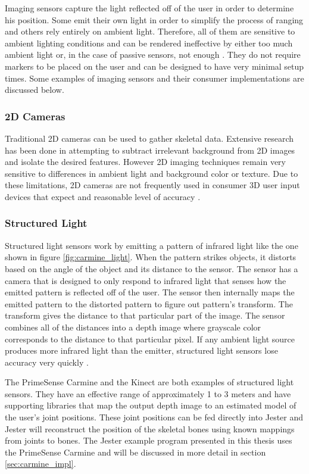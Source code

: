 Imaging sensors capture the light reflected off of the user in order to determine his position. Some emit their own light in order to simplify the process of ranging and others rely entirely on ambient light. Therefore, all of them are sensitive to ambient lighting conditions and can be rendered ineffective by either too much ambient light or, in the case of passive sensors, not enough \cite{besl1988active}. They do not require markers to be placed on the user and can be designed to have very minimal setup times. Some examples of imaging sensors and their consumer implementations are discussed below.

\subsubsection{2D Cameras}

Traditional 2D cameras can be used to gather skeletal data. Extensive research has been done in attempting to subtract irrelevant background from 2D images and isolate the desired features. However 2D imaging techniques remain very sensitive to differences in ambient light and background color or texture. Due to these limitations, 2D cameras are not frequently used in consumer 3D user input devices that expect and reasonable level of accuracy \cite{shimada2001real}.

\subsubsection{Structured Light}

Structured light sensors work by emitting a pattern of infrared light like the one shown in figure \ref{fig:carmine_light}. When the pattern strikes objects, it distorts based on the angle of the object and its distance to the sensor. The sensor has a camera that is designed to only respond to infrared light that senses how the emitted pattern is reflected off of the user. The sensor then internally maps the emitted pattern to the distorted pattern to figure out pattern’s transform. The transform gives the distance to that particular part of the image. The sensor combines all of the distances into a depth image where grayscale color corresponds to the distance to that particular pixel. If any ambient light source produces more infrared light than the emitter, structured light sensors lose accuracy very quickly \cite{scharstein2003high}.

The PrimeSense Carmine and the Kinect are both examples of structured light sensors. They have an effective range of approximately 1 to 3 meters and have supporting libraries that map the output depth image to an estimated model of the user’s joint positions. These joint positions can be fed directly into Jester and Jester will reconstruct the position of the skeletal bones using known mappings from joints to bones. The Jester example program presented in this thesis uses the PrimeSense Carmine and will be discussed in more detail in section \ref{sec:carmine_impl}.

